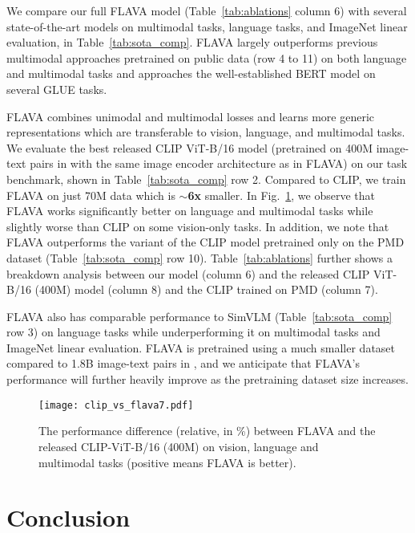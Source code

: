 \documentclass[10pt,twocolumn,letterpaper]{article}
\begin{document}
We compare our full FLAVA model (Table~\ref{tab:ablations} column 6) with several state-of-the-art models on multimodal tasks, language tasks, and ImageNet linear evaluation, in Table~\ref{tab:sota_comp}. FLAVA largely outperforms previous multimodal approaches pretrained on public data (row 4 to 11) on both language and multimodal tasks and approaches the well-established BERT model on several GLUE tasks.

FLAVA combines unimodal and multimodal losses and learns more generic representations which are transferable to vision, language, and multimodal tasks.  We evaluate the best released CLIP \cite{radford2021learning} ViT-B/16 model (pretrained on 400M image-text pairs in \cite{radford2021learning} with the same image encoder architecture as in FLAVA) on our task benchmark, shown in Table~\ref{tab:sota_comp} row 2. Compared to CLIP, we train FLAVA on just 70M data which is \textbf{$\sim$6x} smaller. In Fig.~\ref{fig:clip_vs_flava}, we observe that FLAVA works significantly better on language and multimodal tasks while slightly worse than CLIP on some vision-only tasks. In addition, we note that FLAVA outperforms the variant of the CLIP model pretrained only on the PMD dataset (Table~\ref{tab:sota_comp} row 10). Table~\ref{tab:ablations} further shows a breakdown analysis between our model (column 6) and the released CLIP ViT-B/16 (400M) model (column 8) and the CLIP trained on PMD (column 7).

FLAVA also has comparable performance to SimVLM \cite{wang2021simvlm} (Table~\ref{tab:sota_comp} row 3) on language tasks while underperforming it on multimodal tasks and ImageNet linear evaluation. FLAVA is pretrained using a much smaller dataset compared to 1.8B image-text pairs in \cite{wang2021simvlm}, and we anticipate that FLAVA's performance will further heavily improve as the pretraining dataset size increases.

\begin{figure}[t]
\centering
\texttt{[image: clip\_vs\_flava7.pdf]}
\caption{The performance difference (relative, in \%) between FLAVA and the released CLIP-ViT-B/16 (400M) \cite{radford2021learning} on vision, language and multimodal tasks (positive means FLAVA is better).}
\vspace{-2.0em}
\label{fig:clip_vs_flava}
\end{figure}

\section{Conclusion}
\end{document}
